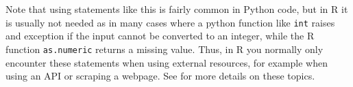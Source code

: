 Note that using  statements like this is fairly common in Python code,
but in R it is usually not needed as in many cases where a python function like \verb|int| raises and exception
if the input cannot be converted to an integer, while the R function \verb|as.numeric| returns a missing value.
Thus, in R you normally only encounter these statements when using external resources,
for example when using an API or scraping a webpage. See  for more details on these topics. 

